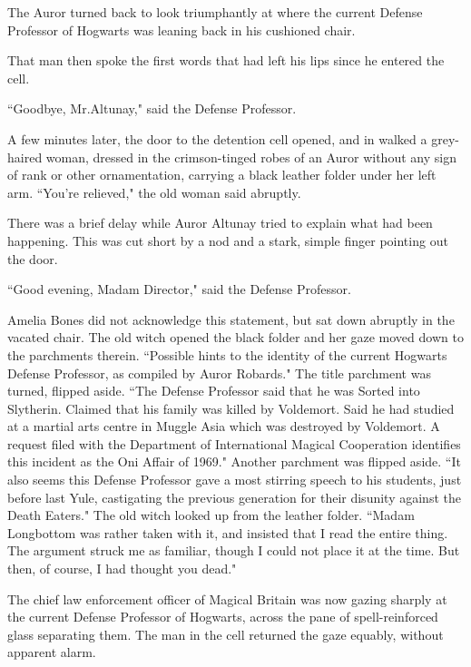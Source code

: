 The Auror turned back to look triumphantly at where the current Defense Professor of Hogwarts was leaning back in his cushioned chair.

That man then spoke the first words that had left his lips since he entered the cell.

``Goodbye, Mr.\?Altunay," said the Defense Professor.

A few minutes later, the door to the detention cell opened, and in walked a grey-haired woman, dressed in the crimson-tinged robes of an Auror without any sign of rank or other ornamentation, carrying a black leather folder under her left arm. ``You're relieved," the old woman said abruptly.

There was a brief delay while Auror Altunay tried to explain what had been happening. This was cut short by a nod and a stark, simple finger pointing out the door.

``Good evening, Madam Director," said the Defense Professor.

Amelia Bones did not acknowledge this statement, but sat down abruptly in the vacated chair. The old witch opened the black folder and her gaze moved down to the parchments therein. ``Possible hints to the identity of the current Hogwarts Defense Professor, as compiled by Auror Robards." The title parchment was turned, flipped aside. ``The Defense Professor said that he was Sorted into Slytherin. Claimed that his family was killed by Voldemort. Said he had studied at a martial arts centre in Muggle Asia which was destroyed by Voldemort. A request filed with the Department of International Magical Cooperation identifies this incident as the Oni Affair of 1969." Another parchment was flipped aside. ``It also seems this Defense Professor gave a most stirring speech to his students, just before last Yule, castigating the previous generation for their disunity against the Death Eaters." The old witch looked up from the leather folder. ``Madam Longbottom was rather taken with it, and insisted that I read the entire thing. The argument struck me as familiar, though I could not place it at the time. But then, of course, I had thought you dead."

The chief law enforcement officer of Magical Britain was now gazing sharply at the current Defense Professor of Hogwarts, across the pane of spell-reinforced glass separating them. The man in the cell returned the gaze equably, without apparent alarm.

